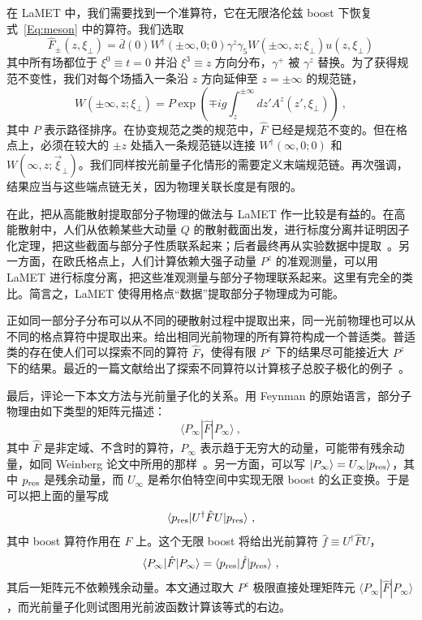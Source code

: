 在 LaMET 中，我们需要找到一个准算符，它在无限洛伦兹 boost 下恢复式~\ref{Eq:meson} 中的算符。我们选取
\begin{equation}
      \hat F_\pm(z, \xi_\perp) = \bar d (0)W^\dagger(\pm\infty,0;0) \gamma^z\gamma_5 W(\pm\infty,z;\xi_\perp)u(z,\xi_\perp)
\end{equation}
其中所有场都位于 $\xi^0\equiv t = 0$ 并沿 $\xi^3\equiv z$ 方向分布，$\gamma^+$ 被 $\gamma^z$ 替换。为了获得规范不变性，我们对每个场插入一条沿 $z$ 方向延伸至 $z=\pm \infty$ 的规范链，
\begin{equation}
        W(\pm\infty, z; \xi_\perp) = P\exp\left(\mp ig\int^{\pm\infty}_z dz'A^z(z', \xi_\perp)\right) \ ,
\end{equation}
其中 $P$ 表示路径排序。在协变规范之类的规范中，$\hat F$ 已经是规范不变的。但在格点上，必须在较大的 $\pm z$ 处插入一条规范链以连接 $W^\dagger(\infty,0;0)$ 和 $W(\infty,z;\vec{\xi}_\perp)$。我们同样按光前量子化情形的需要定义末端规范链。再次强调，结果应当与这些端点链无关，因为物理关联长度是有限的。

在此，把从高能散射提取部分子物理的做法与 LaMET 作一比较是有益的。在高能散射中，人们从依赖某些大动量 $Q$ 的散射截面出发，进行标度分离并证明因子化定理，把这些截面与部分子性质联系起来；后者最终再从实验数据中提取~\cite{Gao:2013xoa}。另一方面，在欧氏格点上，人们计算依赖大强子动量 $P^z$ 的准观测量，可以用 LaMET 进行标度分离，把这些准观测量与部分子物理联系起来。这里有完全的类比。简言之，LaMET 使得用格点``数据''提取部分子物理成为可能。

正如同一部分子分布可以从不同的硬散射过程中提取出来，同一光前物理也可以从不同的格点算符中提取出来。给出相同光前物理的所有算符构成一个普适类。普适类的存在使人们可以探索不同的算符 $\hat F$，使得有限 $P^z$ 下的结果尽可能接近大 $P^z$ 下的结果。最近的一篇文献给出了探索不同算符以计算核子总胶子极化的例子~\cite{Hatta:2013gta}。

最后，评论一下本文方法与光前量子化的关系。用 Feynman 的原始语言，部分子物理由如下类型的矩阵元描述：
\begin{equation}
   \langle P_\infty|\hat F|P_\infty\rangle \ ,
\end{equation}
其中 $\hat F$ 是非定域、不含时的算符，$P_\infty$ 表示趋于无穷大的动量，可能带有残余动量，如同 Weinberg 论文中所用的那样~\cite{Weinberg:1966jm}。另一方面，可以写 $|P_\infty \rangle
= U_\infty|p_{\rm res} \rangle $，其中 $p_{\rm res}$ 是残余动量，而 $U_\infty$ 是希尔伯特空间中实现无限 boost 的幺正变换。于是可以把上面的量写成
\begin{equation}
   \langle p_{\rm res}|U^\dagger \hat FU|p_{\rm res}\rangle \ ,
\end{equation}
其中 boost 算符作用在 $F$ 上。这个无限 boost 将给出光前算符 $\hat f\equiv U^\dagger \hat FU$，
\begin{equation}
       \langle P_\infty|\hat F|P_\infty\rangle  = \langle p_{\rm res}|\hat f|p_{\rm res}\rangle \ ,
\end{equation}
其后一矩阵元不依赖残余动量。本文通过取大 $P^z$ 极限直接处理矩阵元 $\langle P_\infty|\hat F|P_\infty\rangle$，而光前量子化则试图用光前波函数计算该等式的右边。

